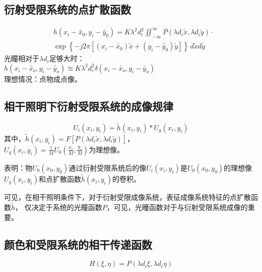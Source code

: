 \documentclass[twocolumn]{ctexart}
\begin{document}
\subsection{衍射受限系统的点扩散函数}
\begin{equation}
    \begin{aligned}
        &h\left(x_i-\tilde{x_0},y_i-\tilde{y_0}\right)=K\lambda ^2 d ^2 _i \iint ^\infty _{-\infty}P\left(\lambda d_i\tilde{x},\lambda d_i\tilde{y}\right)\cdot       \\
        &\exp \left\{-j2\pi \left[\left(x_i-\tilde{x_0}\right)\tilde{x}+\left(y_i-\tilde{y_0}\right)\tilde{y}\right]\right\}\,d\tilde{x}d\tilde{y}
    \end{aligned}
    \nonumber
\end{equation}
光瞳相对于$\lambda d_i$足够大时：\\
$h\left(x_i-\tilde{x_o},y_i-\tilde{y_o}\right)\cong K\lambda ^2 d_i^2\delta \left(x_i-\tilde{x_o},y_i-\tilde{y_o}\right)$\\
理想情况：点物成点像。
\subsection{相干照明下衍射受限系统的成像规律}
\begin{equation}
    U_i\left(x_i,y_i\right)=\tilde{h}\left(x_i,y_i\right)\ast U_g\left(x_i,y_i\right)
    \nonumber
\end{equation}
其中，$\tilde{h}\left(x_i,y_i\right)=F\left[P\left(\lambda d_i \tilde{x},\lambda d_i \tilde{y}\right)\right]$，\\
$U_g\left(x_i,y_i\right)=\frac{1}{M}U_0\left(\frac{x_i}{M},\frac{y_i}{M}\right)$为理想像。\par
表明：物$U_0\left(x_0,y_0\right)$通过衍射受限系统后的像$U_i\left(x_i,y_i\right)$是$U_0\left(x_0,y_0\right)$的理想像
$U_g\left(x_i,y_i\right)$和点扩散函数$\tilde{h}\left(x_i,y_i\right)$的卷积。\par
可见，在相干照明条件下，对于衍射受限成像系统，表征成像系统特征的点扩散函数$\tilde{h}$，
仅决定于系统的光瞳函数$P$，可见，光曈函数对于与衍射受限系统成像的重要。
\subsection{颜色和受限系统的相干传递函数}
\begin{equation}
    H\left(\xi ,\eta \right)=P\left(\lambda d_i \xi , \lambda d_i \eta\right)
    \nonumber
\end{equation}
\end{document}
